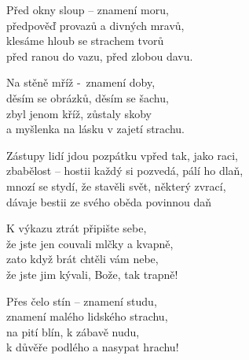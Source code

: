 
\ve{}
Před okny sloup -- znamení moru,\\
předpověď provazů a divných mravů,\\
klesáme hloub se strachem tvorů\\
před ranou do vazu, před zlobou davu. 

\ve{}
Na stěně mříž -\ znamení doby,\\
děsím se obrázků, děsím se šachu,\\
zbyl jenom kříž, zůstaly skoby\\
a myšlenka na lásku v zajetí strachu.

\re{*:}
Zástupy lidí jdou pozpátku vpřed tak, jako raci,\\
zbabělost -- hostii každý si pozvedá, pálí ho dlaň,\\
mnozí se stydí, že stavěli svět, některý zvrací,\\
dávaje bestii ze svého oběda povinnou daň 

\ve{}
K výkazu ztrát připište sebe,\\
že jste jen couvali mlčky a kvapně,\\
zato když brát chtěli vám nebe,\\
že jste jim kývali, Bože, tak trapně!

\ve{}
Přes čelo stín -- znamení studu,\\
znamení malého lidského strachu,\\
na pití blín, k zábavě nudu,\\
k důvěře podlého a nasypat hrachu! 

\esong